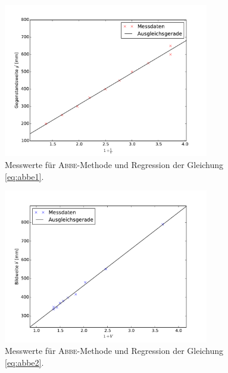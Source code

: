 \begin{figure}[p]
	\centering
	\includegraphics[width=0.8\textwidth]{Bilder/Abbe1.pdf}
	\caption{Messwerte für \texorpdfstring{\textsc{Abbe}}{Abbe}-Methode und Regression der Gleichung \eqref{eq:abbe1}. \cite{matplotlib}}
	\label{fig:abbe1}
\end{figure}
\begin{figure}[p]
	\centering
	\includegraphics[width=0.8\textwidth]{Bilder/Abbe2.pdf}
	\caption{Messwerte für \texorpdfstring{\textsc{Abbe}}{Abbe}-Methode und Regression der Gleichung \eqref{eq:abbe2}.\cite{matplotlib}}
	\label{fig:abbe2}
\end{figure}